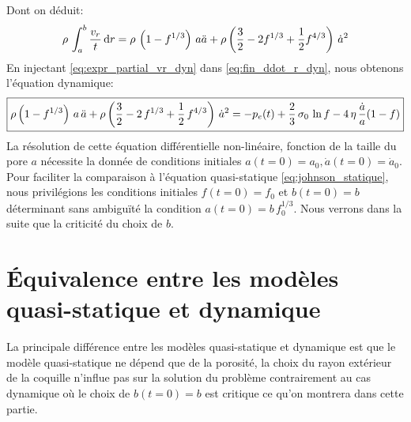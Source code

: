 \documentclass[10pt]{book}
\newcommand{\Int}[2]{\int_{#1}^{#2}}
\begin{document}
Dont on déduit:
\begin{equation}
\rho \, \Int{a}{b} \dfrac{{v_r}}{t}  \dr = \rho\,\pa{1-f^{1/3}}\,a\ddot{a}+\rho\pa{\dfrac{3}{2}-2f^{1/3}+\dfrac{1}{2}f^{4/3}}\,\dot{a}^2
\label{eq:expr_partial_vr_dyn}
\end{equation}
En injectant \eqref{eq:expr_partial_vr_dyn} dans \eqref{eq:fin_ddot_r_dyn}, nous obtenons l'équation dynamique: 
$$\boxed{\rho \left(1-f^{1/3}\right)\,a\,\ddot{a} + \rho \left(\dfrac{3}{2}-2\,f^{1/3} + \dfrac{1}{2}\,f^{4/3}\right)\,\dot{a}^2 = - p_e(t) + \frac{2}{3}\,\sigma_0\,\ln{f} - 4\,\eta\,\dfrac{\dot{a}}{a}(1-f)}$$
La résolution de cette équation différentielle non-linéaire, fonction de la taille du pore $a$ nécessite la donnée de conditions initiales $a(t=0)=a_{0},\dot{a}(t=0)=\dot{a}_{0}$. Pour faciliter la comparaison à l'équation quasi-statique \eqref{eq:johnson_statique}, nous privilégions les conditions initiales $f(t=0)=f_0$ et $b(t=0)=b$ déterminant sans ambiguïté la condition $a(t=0)=b\,f_0^{1/3}$. Nous verrons dans la suite que la criticité du choix de $b$. 
\section{\'Equivalence entre les modèles quasi-statique et dynamique}
La principale différence entre les modèles quasi-statique et dynamique est que le modèle quasi-statique ne dépend que de la porosité, la choix du rayon extérieur de la coquille n'influe pas sur la solution du problème contrairement au cas dynamique où le choix de $b(t=0)=b$ est critique ce qu'on montrera dans cette partie.
\end{document}
